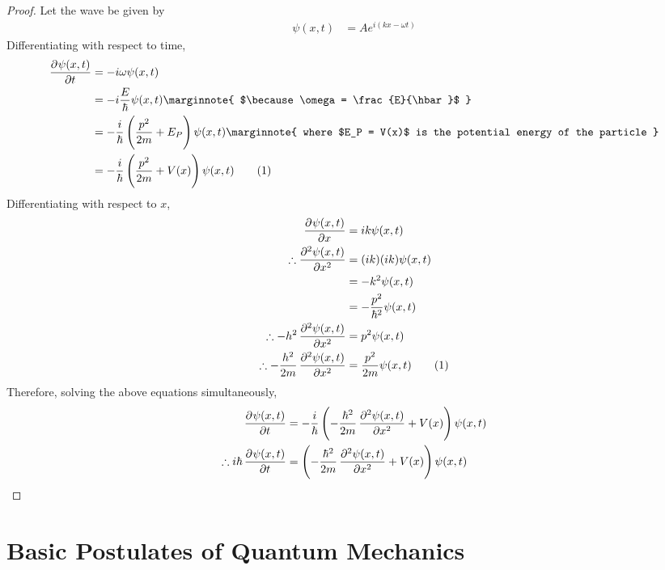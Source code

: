 \documentclass[titlepage, fleqn, a4paper, 12pt, twoside]{article}
\newcommand\numberthis{\addtocounter{equation}{1}\tag{\theequation}} %
\theoremstyle{definition}
\theoremstyle{theorem}
\let\Oldsection\section
\renewcommand{\section}{\FloatBarrier\Oldsection}
\begin{document}
\begin{proof}
	Let the wave be given by
	\begin{align*}
		\psi(x,t) & = A e^{i (k x - \omega t)}
	\end{align*}
	Differentiating with respect to time,
	\begin{align*}
		\dpd{\psi(x,t)}{t}  & = -i \omega \psi(x,t) \\
                                    & = -i \frac{E}{\hbar} \psi(x,t)
		\marginnote
		{
			$\because \omega = \frac{E}{\hbar}$
		}                  \\
                                    & = -\frac{i}{\hbar} \left( \frac{p^2}{2 m} + E_P \right) \psi(x,t)
		\marginnote
		{
			where $E_P = V(x)$ is the potential energy of the particle
		}                  \\
                                    & = -\frac{i}{\hbar} \left( \frac{p^2}{2 m} + V(x) \right) \psi(x,t)
			\numberthis
	\end{align*}
	Differentiating with respect to $x$,
	\begin{align*}
		\dpd{\psi(x,t)}{x}                                & = i k \psi(x,t)                  \\
		\therefore \dpd[2]{\psi(x,t)}{x}                  & = (i k) (i k) \psi(x,t)          \\
                                                                  & = -k^2 \psi(x,t)                 \\
                                                                  & = -\frac{p^2}{\hbar^2} \psi(x,t) \\
		\therefore -h^2 \dpd[2]{\psi(x,t)}{x}             & = p^2 \psi(x,t)                  \\
		\therefore -\frac{h^2}{2 m} \dpd[2]{\psi(x,t)}{x} & = \frac{p^2}{2 m} \psi(x,t)
			\numberthis
	\end{align*}
	Therefore, solving the above equations simultaneously,
	\begin{align*}
		\dpd{\psi(x,t)}{t}                    & = -\frac{i}{\hbar} \left( -\frac{\hbar^2}{2 m} \dpd[2]{\psi(x,t)}{x} + V(x) \right) \psi(x,t) \\
		\therefore i \hbar \dpd{\psi(x,t)}{t} & = \left( -\frac{\hbar^2}{2 m} \dpd[2]{\psi(x,t)}{x} + V(x) \right) \psi(x,t)
	\end{align*}
\end{proof}

\section{Basic Postulates of Quantum Mechanics}
\end{document}
